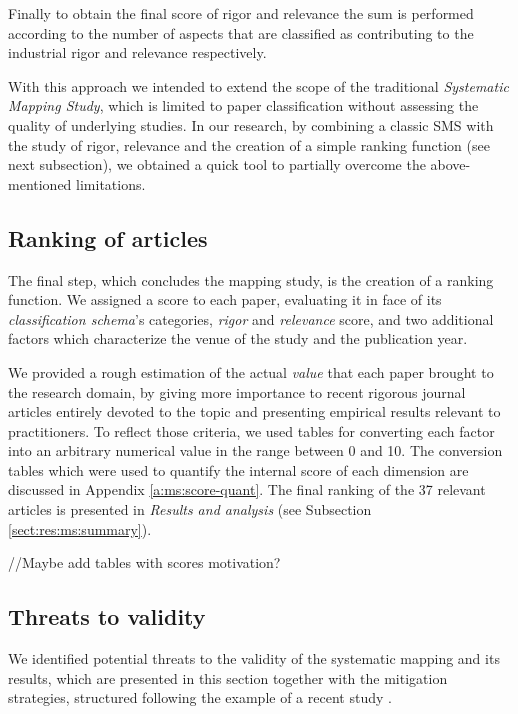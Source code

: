 \documentclass[final,5p,times,twocolumn]{elsarticle}
\begin{document}
Finally to obtain the final score of rigor and relevance the sum is performed according to the number of aspects that are classified as contributing to the industrial rigor and relevance respectively.

With this approach we intended to extend the scope of the traditional \textit{Systematic Mapping Study}, which is limited to paper classification without assessing the quality of underlying studies. In our research, by combining a classic SMS with the study of rigor, relevance and the creation of a simple ranking function (see next subsection), we obtained a quick tool to partially overcome the above-mentioned limitations.




\subsection{Ranking of articles} %
\label{sub:ranking_of_articles}
The final step, which concludes the mapping study, is the creation of a ranking function. We assigned a score to each paper, evaluating it in face of its \textit{classification schema}’s categories, \textit{rigor} and \textit{relevance} score, and two additional factors which characterize the venue of the study and the publication year.

We provided a rough estimation of the actual \textit{value} that each paper brought to the research domain, by giving more importance to recent rigorous journal articles entirely devoted to the topic and presenting empirical results relevant to practitioners. To reflect those criteria, we used tables for converting each factor into an arbitrary numerical value in the range between 0 and 10. The conversion tables which were used to quantify the internal score of each dimension are discussed in Appendix \ref{a:ms:score-quant}. The final ranking of the 37 relevant articles is presented in \textit{Results and analysis} (see Subsection \ref{sect:res:ms:summary}).


//Maybe add tables with  scores motivation?



\subsection{Threats to validity} 
 \label{sub:validity}

We identified potential threats to the validity of the systematic mapping and its results, which are presented in this section together with the mitigation strategies, structured following the example of  a recent study \cite{Unterkalmsteiner2012}.
\end{document}
